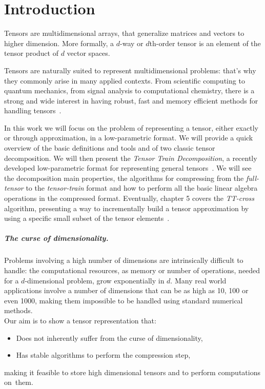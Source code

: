\chapter{Introduction}
Tensors are multidimensional arrays, that generalize matrices and vectors to higher dimension. More formally, a $d$-way or $d$th-order tensor is an element of the tensor product of $d$ vector spaces.

Tensors are naturally suited to represent multidimensional problems: that's why they commonly arise in many applied contexts. From scientific computing to quantum mechanics, from signal analysis to computational chemistry, there is a strong and wide interest in having robust, fast and memory efficient methods for handling tensors~\cite{tensorreview}.%

In this work we will focus on the problem of representing a tensor, either exactly or through approximation, in a low-parametric format.
We will provide a quick overview of the basic definitions and tools and of two classic tensor decomposition. We will then present the \emph{Tensor Train Decomposition}, a recently developed low-parametric format for representing general tensors~\cite{oseledetstyrty2009,oseledets2011tt}. We will see the decomposition main properties, the algorithms for compressing from the \emph{full-tensor} to the \emph{tensor-train} format and how to perform all the basic linear algebra operations in the compressed format. Eventually, chapter 5 covers the \emph{TT-cross} algorithm, presenting a way to incrementally build a tensor approximation by using a specific small subset of the tensor elements~\cite{tt-cross}.

\paragraph{The curse of dimensionality.}
Problems involving a high number of dimensions are intrinsically difficult to handle: the computational resources, as memory or number of operations, needed for a $d$-dimensional problem, grow exponentially in $d$. Many real world applications involve a number of dimensions that can be as high as 10, 100 or even 1000, making them impossible to be handled using standard numerical methods.\\
Our aim is to show a tensor representation that:
\begin{itemize}
\item Does not inherently suffer from the curse of dimensionality,
\item Has stable algorithms to perform the compression step,
\end{itemize}
making it feasible to store high dimensional tensors and to perform computations on~them.
